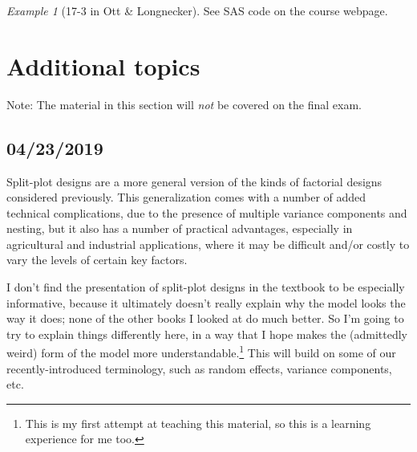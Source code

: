 \documentclass[a4paper, 12pt]{article}
\theoremstyle{plain}
\theoremstyle{definition}
\theoremstyle{remark}
\newtheorem*{example}{Example}
\begin{document}
\begin{example}[17-3 in Ott \& Longnecker]
See SAS code on the course webpage.
\end{example}



\section{Additional topics}

Note: The material in this section will {\em not} be covered on the final exam.

\subsection*{04/23/2019}

Split-plot designs are a more general version of the kinds of factorial designs considered previously.  This generalization comes with a number of added technical complications, due to the presence of multiple variance components and nesting, but it also has a number of practical advantages, especially in agricultural and industrial applications, where it may be difficult and/or costly to vary the levels of certain key factors.  

I don't find the presentation of split-plot designs in the textbook to be especially informative, because it ultimately doesn't really explain why the model looks the way it does; none of the other books I looked at do much better.  So I'm going to try to explain things differently here, in a way that I hope makes the (admittedly weird) form of the model more understandable.\footnote{This is my first attempt at teaching this material, so this is a learning experience for me too.}  This will build on some of our recently-introduced terminology, such as random effects, variance components, etc.  
\end{document}
